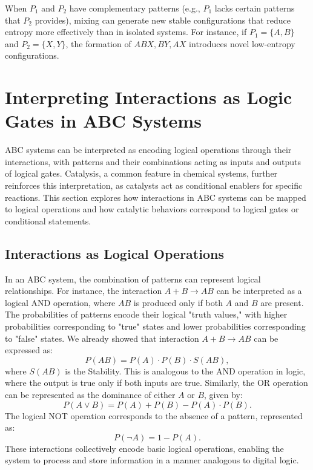 \documentclass[entropy,article,submit,pdftex,moreauthors]{Definitions/mdpi}
\begin{document}
When \( P_1 \) and \( P_2 \) have complementary patterns (e.g., \( P_1 \) lacks certain patterns that \( P_2 \) provides), mixing can generate new stable configurations that reduce entropy more effectively than in isolated systems. For instance, if \( P_1 = \{A, B\} \) and \( P_2 = \{X, Y\} \), the formation of \( ABX, BY, AX \) introduces novel low-entropy configurations.


\section{Interpreting Interactions as Logic Gates in ABC Systems}

ABC systems can be interpreted as encoding logical operations through their interactions, with patterns and their combinations acting as inputs and outputs of logical gates. Catalysis, a common feature in chemical systems, further reinforces this interpretation, as catalysts act as conditional enablers for specific reactions. This section explores how interactions in ABC systems can be mapped to logical operations and how catalytic behaviors correspond to logical gates or conditional statements.

\subsection{Interactions as Logical Operations}

In an ABC system, the combination of patterns can represent logical relationships. For instance, the interaction \( A + B \to AB \) can be interpreted as a logical AND operation, where \( AB \) is produced only if both \( A \) and \( B \) are present. The probabilities of patterns encode their logical "truth values," with higher probabilities corresponding to "true" states and lower probabilities corresponding to "false" states. We already showed that interaction \( A + B \to AB \) can be expressed as:
\[
P(AB) = P(A) \cdot P(B) \cdot S(AB),
\]
where \( S(AB) \) is the Stability. This is analogous to the AND operation in logic, where the output is true only if both inputs are true. Similarly, the OR operation can be represented as the dominance of either \( A \) or \( B \), given by:
\[
P(A \lor B) = P(A) + P(B) - P(A) \cdot P(B).
\]
The logical NOT operation corresponds to the absence of a pattern, represented as:
\[
P(\neg A) = 1 - P(A).
\]
These interactions collectively encode basic logical operations, enabling the system to process and store information in a manner analogous to digital logic.
\end{document}
